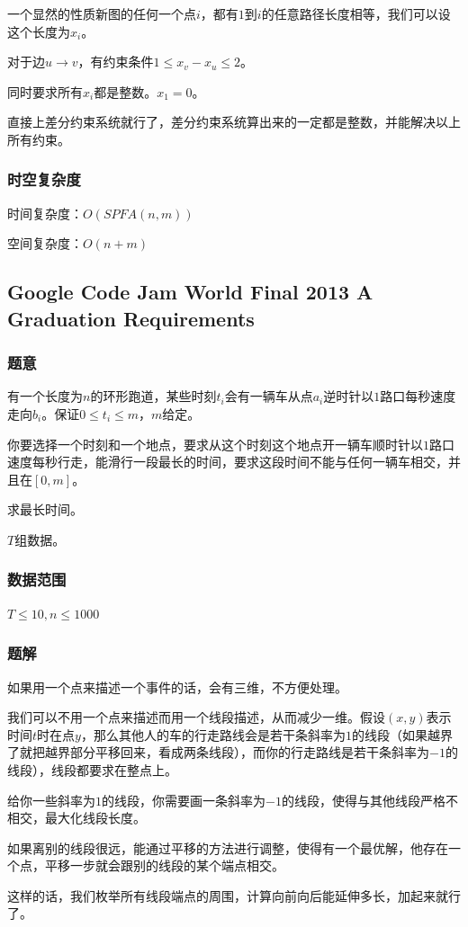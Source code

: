 \documentclass{ctexart}
\begin{document}
一个显然的性质新图的任何一个点$i$，都有$1$到$i$的任意路径长度相等，我们可以设这个长度为$x_i$。

对于边$u \rightarrow v$，有约束条件$1 \le x_v-x_u \le 2$。

同时要求所有$x_i$都是整数。$x_1=0$。

直接上差分约束系统就行了，差分约束系统算出来的一定都是整数，并能解决以上所有约束。
\subsubsection{时空复杂度}
时间复杂度：$O(SPFA(n,m))$

空间复杂度：$O(n+m)$
\subsection{Google Code Jam World Final 2013 A Graduation Requirements}
\subsubsection{题意}
有一个长度为$n$的环形跑道，某些时刻$t_i$会有一辆车从点$a_i$逆时针以$1$路口每秒速度走向$b_i$。保证$0 \le t_i \le m$，$m$给定。

你要选择一个时刻和一个地点，要求从这个时刻这个地点开一辆车顺时针以$1$路口速度每秒行走，能滑行一段最长的时间，要求这段时间不能与任何一辆车相交，并且在$[0,m]$。

求最长时间。

$T$组数据。
\subsubsection{数据范围}
$T \le 10,n \le 1000$
\subsubsection{题解}
如果用一个点来描述一个事件的话，会有三维，不方便处理。

我们可以不用一个点来描述而用一个线段描述，从而减少一维。假设$(x,y)$表示时间$t$时在点$y$，那么其他人的车的行走路线会是若干条斜率为$1$的线段（如果越界了就把越界部分平移回来，看成两条线段），而你的行走路线是若干条斜率为$-1$的线段），线段都要求在整点上。

给你一些斜率为$1$的线段，你需要画一条斜率为$-1$的线段，使得与其他线段严格不相交，最大化线段长度。

如果离别的线段很远，能通过平移的方法进行调整，使得有一个最优解，他存在一个点，平移一步就会跟别的线段的某个端点相交。

这样的话，我们枚举所有线段端点的周围，计算向前向后能延伸多长，加起来就行了。
\end{document}
